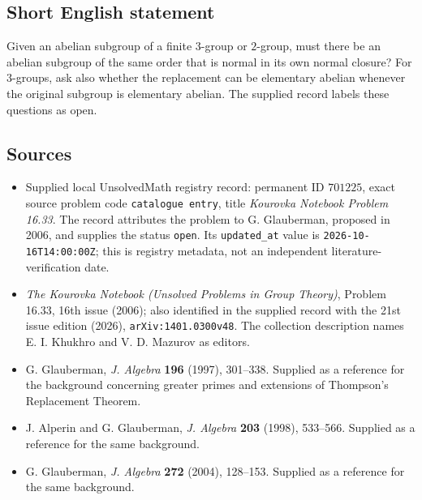 \documentclass[11pt]{article}
\begin{document}
\subsection{Short English statement}
Given an abelian subgroup of a finite \(3\)-group or \(2\)-group, must there be an abelian subgroup of the same order that is normal in its own normal closure? For \(3\)-groups, ask also whether the replacement can be elementary abelian whenever the original subgroup is elementary abelian. The supplied record labels these questions as open.
\subsection{Sources}
\begin{itemize}
\item Supplied local UnsolvedMath registry record: permanent ID \(701225\), exact source problem code \texttt{catalogue entry}, title \emph{Kourovka Notebook Problem 16.33}. The record attributes the problem to G. Glauberman, proposed in 2006, and supplies the status \texttt{open}. Its \texttt{updated\_at} value is \texttt{2026-10-16T14:00:00Z}; this is registry metadata, not an independent literature-verification date.
\item \emph{The Kourovka Notebook (Unsolved Problems in Group Theory)}, Problem 16.33, 16th issue (2006); also identified in the supplied record with the 21st issue edition (2026), \texttt{arXiv:1401.0300v48}. The collection description names E. I. Khukhro and V. D. Mazurov as editors.
\item G. Glauberman, \emph{J. Algebra} \textbf{196} (1997), 301--338. Supplied as a reference for the background concerning greater primes and extensions of Thompson's Replacement Theorem.
\item J. Alperin and G. Glauberman, \emph{J. Algebra} \textbf{203} (1998), 533--566. Supplied as a reference for the same background.
\item G. Glauberman, \emph{J. Algebra} \textbf{272} (2004), 128--153. Supplied as a reference for the same background.
\end{itemize}
\end{document}
